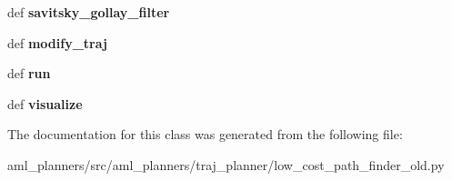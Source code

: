 \begin{DoxyCompactItemize}
\item 
\hypertarget{classaml__planners_1_1traj__planner_1_1low__cost__path__finder__old_1_1_low_cost_path_finder_a11cc93bcaa94899edad92a5a5ba67984}{def {\bfseries savitsky\-\_\-gollay\-\_\-filter}}\label{classaml__planners_1_1traj__planner_1_1low__cost__path__finder__old_1_1_low_cost_path_finder_a11cc93bcaa94899edad92a5a5ba67984}

\item 
\hypertarget{classaml__planners_1_1traj__planner_1_1low__cost__path__finder__old_1_1_low_cost_path_finder_a7f0cc7616d3e62dad1e723c77ef24756}{def {\bfseries modify\-\_\-traj}}\label{classaml__planners_1_1traj__planner_1_1low__cost__path__finder__old_1_1_low_cost_path_finder_a7f0cc7616d3e62dad1e723c77ef24756}

\item 
\hypertarget{classaml__planners_1_1traj__planner_1_1low__cost__path__finder__old_1_1_low_cost_path_finder_aa4fe4706ae2ee98a5db5fa1a917ae825}{def {\bfseries run}}\label{classaml__planners_1_1traj__planner_1_1low__cost__path__finder__old_1_1_low_cost_path_finder_aa4fe4706ae2ee98a5db5fa1a917ae825}

\item 
\hypertarget{classaml__planners_1_1traj__planner_1_1low__cost__path__finder__old_1_1_low_cost_path_finder_a757aeae7162787da738ecbb5b208d8ae}{def {\bfseries visualize}}\label{classaml__planners_1_1traj__planner_1_1low__cost__path__finder__old_1_1_low_cost_path_finder_a757aeae7162787da738ecbb5b208d8ae}

\end{DoxyCompactItemize}


The documentation for this class was generated from the following file\-:\begin{DoxyCompactItemize}
\item 
aml\-\_\-planners/src/aml\-\_\-planners/traj\-\_\-planner/low\-\_\-cost\-\_\-path\-\_\-finder\-\_\-old.\-py\end{DoxyCompactItemize}
